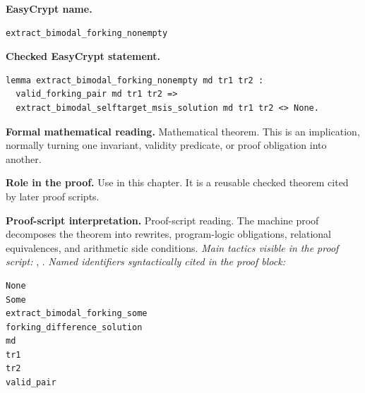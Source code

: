 \begin{formaltheorem}
\noindent\textbf{EasyCrypt name.}
\begin{lstlisting}[language=EasyCrypt,basicstyle=\ttfamily\scriptsize]
extract_bimodal_forking_nonempty
\end{lstlisting}
\noindent\textbf{Checked EasyCrypt statement.}
\begin{lstlisting}[language=EasyCrypt,basicstyle=\ttfamily\scriptsize]
lemma extract_bimodal_forking_nonempty md tr1 tr2 :
  valid_forking_pair md tr1 tr2 =>
  extract_bimodal_selftarget_msis_solution md tr1 tr2 <> None.
\end{lstlisting}
\noindent\textbf{Formal mathematical reading.}
Mathematical theorem. This is an implication, normally turning one invariant, validity predicate, or proof obligation into another.

\noindent\textbf{Role in the proof.}
Use in this chapter. It is a reusable checked theorem cited by later proof scripts.

\noindent\textbf{Proof-script interpretation.}
Proof-script reading. The machine proof decomposes the theorem into rewrites, program-logic obligations, relational equivalences, and arithmetic side conditions.
\emph{Main tactics visible in the proof script:} , .
\emph{Named identifiers syntactically cited in the proof block:}
\begin{lstlisting}[language=EasyCrypt,basicstyle=\ttfamily\scriptsize]
None
Some
extract_bimodal_forking_some
forking_difference_solution
md
tr1
tr2
valid_pair
\end{lstlisting}

\end{formaltheorem}

